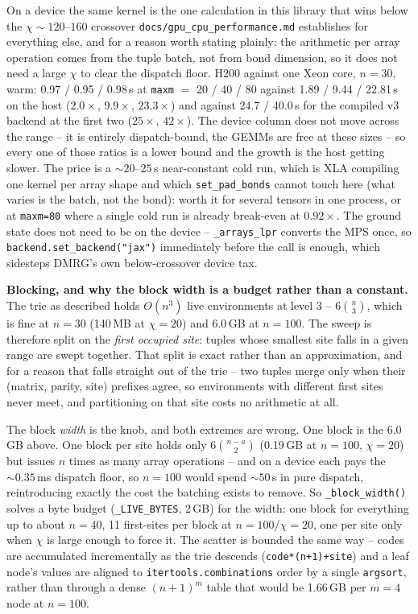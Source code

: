 \documentclass[11pt]{article}
\begin{document}
On a device the same kernel is the one calculation in this library that wins
below the $\chi\sim120$--$160$ crossover
\texttt{docs/gpu\_cpu\_performance.md} establishes for everything else, and
for a reason worth stating plainly: the arithmetic per array operation comes
from the tuple batch, not from bond dimension, so it does not need a large
$\chi$ to clear the dispatch floor. H200 against one Xeon core, $n=30$, warm:
0.97 / 0.95 / 0.98\,s at \texttt{maxm} $=$ 20 / 40 / 80 against 1.89 / 9.44 /
22.81\,s on the host ($2.0\times$, $9.9\times$, $23.3\times$) and against
24.7 / 40.0\,s for the compiled v3 backend at the first two ($25\times$,
$42\times$). The device column does not move across the range -- it is
entirely dispatch-bound, the GEMMs are free at these sizes -- so every one of
those ratios is a lower bound and the growth is the host getting slower. The
price is a ${\sim}20$--$25$\,s near-constant cold run, which is XLA compiling
one kernel per array shape and which \texttt{set\_pad\_bonds} cannot touch
here (what varies is the batch, not the bond): worth it for several tensors
in one process, or at \texttt{maxm=80} where a single cold run is already
break-even at $0.92\times$. The ground state does not need to be on the
device -- \texttt{\_arrays\_lpr} converts the MPS once, so
\texttt{backend.set\_backend("jax")} immediately before the call is enough,
which sidesteps DMRG's own below-crossover device tax.

\textbf{Blocking, and why the block width is a budget rather than a
constant.} The trie as described holds $O(n^3)$ live environments at level
3 -- $6\binom{n}{3}$, which is fine at $n=30$ (140\,MB at $\chi=20$) and
6.0\,GB at $n=100$. The sweep is therefore split on the \emph{first occupied
site}: tuples whose smallest site falls in a given range are swept together.
That split is exact rather than an approximation, and for a reason that falls
straight out of the trie -- two tuples merge only when their (matrix, parity,
site) prefixes agree, so environments with different first sites never meet,
and partitioning on that site costs no arithmetic at all.

The block \emph{width} is the knob, and both extremes are wrong. One block is
the 6.0\,GB above. One block per site holds only $6\binom{n-a}{2}$ (0.19\,GB
at $n=100$, $\chi=20$) but issues $n$ times as many array operations -- and on
a device each pays the ${\sim}0.35$\,ms dispatch floor, so $n=100$ would spend
${\sim}50$\,s in pure dispatch, reintroducing exactly the cost the batching
exists to remove. So \texttt{\_block\_width()} solves a byte budget
(\texttt{\_LIVE\_BYTES}, 2\,GB) for the width: one block for everything up to
about $n=40$, 11 first-sites per block at $n=100$/$\chi=20$, one per site only
when $\chi$ is large enough to force it. The scatter is bounded the same way
-- codes are accumulated incrementally as the trie descends
(\texttt{code*(n+1)+site}) and a leaf node's values are aligned to
\texttt{itertools.combinations} order by a single \texttt{argsort}, rather
than through a dense $(n+1)^m$ table that would be 1.66\,GB per $m=4$ node at
$n=100$.
\end{document}
